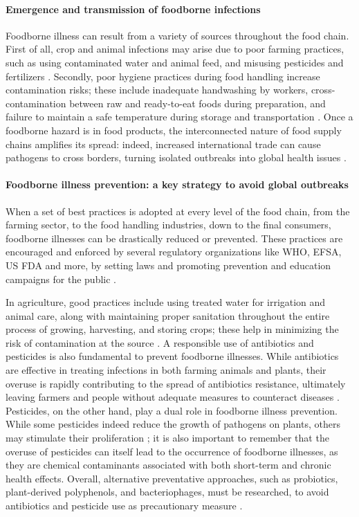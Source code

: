 \paragraph{Emergence and transmission of foodborne infections}
Foodborne illness can result from a variety of sources throughout the food chain. First of all, crop and animal infections may arise due to poor farming practices, such as using contaminated water and animal feed, and misusing pesticides and fertilizers \citep{whoBurden2015}. Secondly, poor hygiene practices during food handling increase contamination risks; these include inadequate handwashing by workers, cross-contamination between raw and ready-to-eat foods during preparation, and failure to maintain a safe temperature during storage and transportation \citep{toddFoodBorne2020}. Once a foodborne hazard is in food products, the interconnected nature of food supply chains amplifies its spread: indeed, increased international trade can cause pathogens to cross borders, turning isolated outbreaks into global health issues \citep{velusamyOverview2010}.

\paragraph{Foodborne illness prevention: a key strategy to avoid global outbreaks}
When a set of best practices is adopted at every level of the food chain, from the farming sector, to the food handling industries, down to the final consumers, foodborne illnesses can be drastically reduced or prevented.
These practices are encouraged and enforced by several regulatory organizations like WHO, EFSA, US FDA and more, by setting laws and promoting prevention and education campaigns for the public \citep{tauxeEmerging1997}.

In agriculture, good practices include using treated water for irrigation and animal care, along with maintaining proper sanitation throughout the entire process of growing, harvesting, and storing crops; these help in minimizing the risk of contamination at the source \citep{faoAssuring2003}.
A responsible use of antibiotics and pesticides is also fundamental to prevent foodborne illnesses. While antibiotics are effective in treating infections in both farming animals and plants, their overuse is rapidly contributing to the spread of antibiotics resistance, ultimately leaving farmers and people without adequate measures to counteract diseases \citep{canicaAntibiotic2019}. 
Pesticides, on the other hand, play a dual role in foodborne illness prevention. While some pesticides indeed reduce the growth of pathogens on plants, others may stimulate their proliferation \citep{dobhalSurvival2014}; it is also important to remember that the overuse of pesticides can itself lead to the occurrence of foodborne illnesses, as they are chemical contaminants associated with both short-term and chronic health effects. Overall, alternative preventative approaches, such as probiotics, plant-derived polyphenols, and bacteriophages, must be researched, to avoid antibiotics and pesticide use as precautionary measure \citep{friedmanAntibioticResistant2015,maAntimicrobial2019}.

